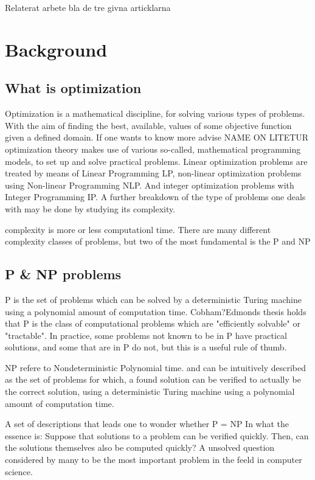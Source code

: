 Relaterat arbete bla de tre givna articklarna
 
\section{Background}
 
\subsection{What is optimization}
 
Optimization is a mathematical discipline, for solving various types of problems. With the aim of finding the best, available, values of some objective function given a defined domain. If one wants to know more advise NAME ON LITETUR\\
 
optimization theory makes use of various so-called, mathematical programming models, to set up and solve practical problems. Linear optimization problems are treated by means of Linear Programming LP, non-linear optimization problems using Non-linear Programming NLP. And integer optimization problems with Integer Programming IP.
A further breakdown of the type of problems one deals with may be done by studying its complexity.
 
complexity is more or less computationl time. There are many different complexity classes of problems, but two of the most fundamental is the P and NP
 
\subsection{P \& NP problems}
 
P is the set of problems which can be solved by a deterministic Turing machine using a polynomial amount of computation time.
Cobham?Edmonds thesis holds that P is the class of computational problems which are "efficiently solvable" or "tractable". In practice, some problems not known to be in P have practical solutions, and some that are in P do not, but this is a useful rule of thumb.
 
NP refere to Nondeterministic Polynomial time. and can be intuitively described as the set of problems for which, a found solution can be verified to actually be the correct solution, using a deterministic Turing machine using a polynomial amount of computation time.
 
A set of descriptions that leads one to wonder whether
P = NP
In what the essence is:
Suppose that solutions to a problem can be verified quickly. Then, can the solutions themselves also be computed quickly?
A unsolved question considered by many to be the most important problem in the feeld in computer science.
 

